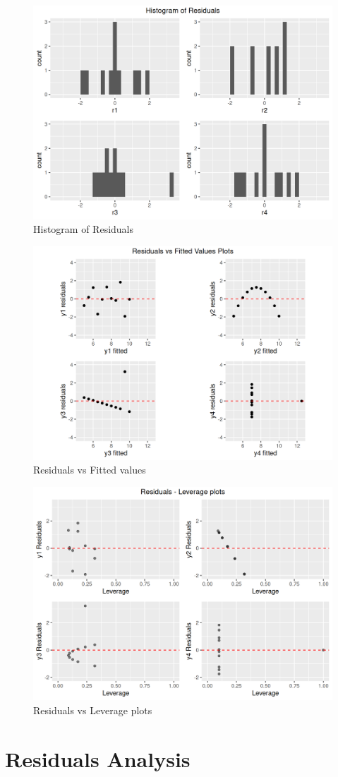 \documentclass[12pt]{article}
\begin{document}
\begin{figure}[htbp]
\includegraphics[width=.7\textwidth]{histogram.png}
\centering
\caption{Histogram of Residuals}
\label{Fig:histogram}
\end{figure}

\begin{figure}[htbp]
\includegraphics[width=.7\textwidth]{RVF.png}
\centering
\caption{Residuals vs Fitted values}
\label{Fig:RVF}
\end{figure}

\begin{figure}[htbp]
\includegraphics[width=.7\textwidth]{RVL.png}
\centering
\caption{Residuals vs Leverage plots}
\label{Fig:RVL}
\end{figure}


	

	\section{Residuals Analysis}
	
		
	

	
\end{document}
